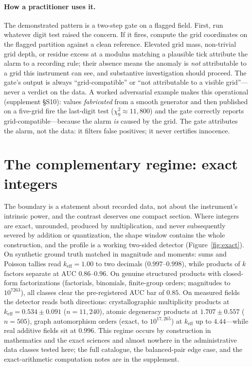 \documentclass[12pt]{article}
\newcommand{\keff}{k_{\mathrm{eff}}}
\begin{document}
\paragraph{How a practitioner uses it.}
The demonstrated pattern is a two-step gate on a flagged field. First, run
whatever digit test raised the concern. If it fires, compute the grid
coordinates on the flagged partition against a clean reference. Elevated grid
mass, non-trivial grid depth, or residue excess at a modulus matching a
plausible tick attribute the alarm to a recording rule; their absence means
the anomaly is \emph{not} attributable to a grid this instrument can see, and
substantive investigation should proceed. The gate's output is always
``grid-compatible'' or ``not attributable to a visible grid''---never a
verdict on the data. A worked adversarial example makes this operational
(supplement \S S10): values \emph{fabricated} from a smooth generator and
then published on a five-grid fire the last-digit test
($\chi^2_9 \approx 11{,}800$) and the gate correctly reports
grid-compatible---because the alarm \emph{is} caused by the grid. The gate
attributes the alarm, not the data: it filters false positives; it never
certifies innocence.

\section{The complementary regime: exact integers}
\label{sec:exact}

The boundary is a statement about recorded data, not about the instrument's
intrinsic power, and the contrast deserves one compact section. Where integers
are exact, unrounded, produced by multiplication, and never subsequently
severed by addition or quantization, the shape window contains the whole
construction, and the profile is a working two-sided detector
(Figure~\ref{fig:exact}). On synthetic ground truth matched in magnitude and
moments: sums and Poisson tallies read $\keff = 1.00$ to two decimals
($0.997$--$0.998$), while products
of $k$ factors separate at AUC $0.86$--$0.96$. On genuine structured products
with closed-form factorizations (factorials, binomials, finite-group orders;
magnitudes to $10^{7263}$), all classes clear the pre-registered AUC bar of
$0.85$. On measured fields the detector reads both directions:
crystallographic multiplicity products at $\keff = 0.534 \pm 0.091$
($n = 11{,}240$), atomic degeneracy products at $1.707 \pm 0.557$ ($n = 505$),
graph automorphism orders (exact, to $10^{17{,}265}$) at $\keff$ up to
$4.44$---while real additive fields sit at $0.996$. This regime occurs by
construction in mathematics and the exact sciences and almost nowhere in
the administrative data classes tested here; the full catalogue, the balanced-pair edge case, and the
exact-arithmetic computation notes are in the supplement.
\end{document}
